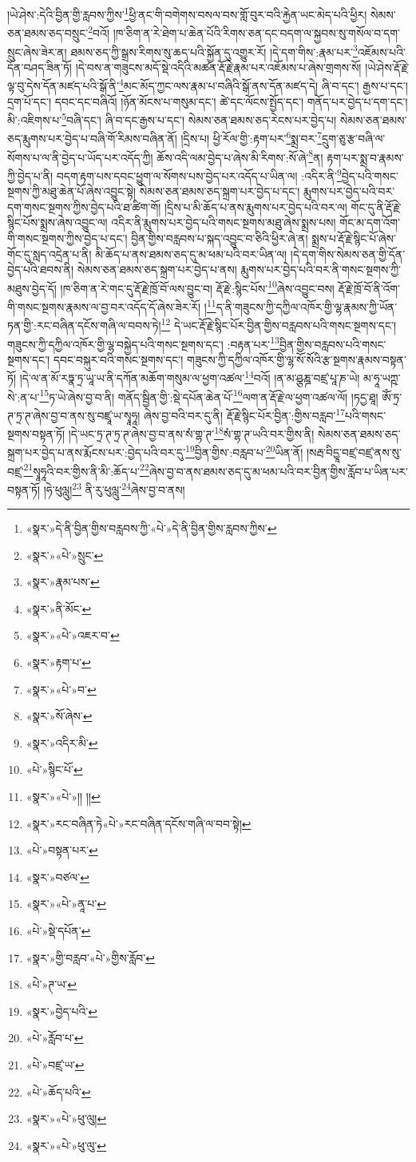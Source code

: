 །ཡེ་ཤེས་:དེའི་བྱིན་གྱི་རླབས་ཀྱིས་\footnote{«སྣར་»དེ་ནི་བྱིན་གྱིས་བརླབས་ཀྱི་«པེ་»དེ་ནི་བྱིན་གྱིས་རླབས་ཀྱིས་}ཕྱི་ནང་གི་བགེགས་བསལ་བས་གློ་བུར་བའི་རྐྱེན་ཡང་མེད་པའི་ཕྱིར། སེམས་ཅན་ཐམས་ཅད་བསྲུང་\footnote{«སྣར་»«པེ་»སྲུང་}བའོ། །ཁ་ཅིག་ན་རེ་ཐེག་པ་ཆེན་པོའི་རིགས་ཅན་དང་བདག་ལ་སྐྱབས་སུ་གསོལ་བ་དག་སྲུང་ཞེས་ཟེར་ན། ཐམས་ཅད་ཀྱི་སྒྲས་རིགས་སུ་ཆད་པའི་སྐྱོན་དུ་འགྱུར་རོ། །དེ་དག་གིས་:རྣམ་པར་\footnote{«སྣར་»རྣམ་པས་}འཇོམས་པའི་དོན་བཤད་ཟིན་ཏོ། །དེ་བས་ན་གཟུངས་མདོ་སྡེ་འདིའི་མཚན་རྡོ་རྗེ་རྣམ་པར་འཇོམས་པ་ཞེས་གྲགས་སོ། །ཡེ་ཤེས་རྡོ་རྗེ་ལྟ་བུ་དེས་དོན་མཛད་པའི་སྒོ་ནི་\footnote{«སྣར་»ནི་མོང་}མང་མོད་ཀྱང་ལས་རྣམ་པ་བཞིའི་སྒོ་ནས་དོན་མཛད་དེ། ཞི་བ་དང་། རྒྱས་པ་དང་། དྲག་པོ་དང་། དབང་དང་བཞིའོ། །ཉོན་མོངས་པ་གསུམ་དང་། ཚེ་དང་ལོངས་སྤྱོད་དང་། གནོད་པར་བྱེད་པ་དག་དང་། མི་:འཇིགས་པ་\footnote{«སྣར་»«པེ་»འཇར་བ་}བཞི་དང་། ཞི་བ་དང་རྒྱས་པ་དང་། སེམས་ཅན་ཐམས་ཅད་རེངས་པར་བྱེད་པ། སེམས་ཅན་ཐམས་ཅད་རྨུགས་པར་བྱེད་པ་བཞི་གོ་རིམས་བཞིན་ནོ། །དྲིས་པ། ཕྱི་རོལ་གྱི་:རྟག་པར་\footnote{«སྣར་»རྟག་པ་}སྨྲ་བར་\footnote{«སྣར་»«པེ་»བ་}དྲུག་ཅུ་རྩ་བཞི་ལ་སོགས་པ་ལ་ནི་བྱེད་པ་ཡོད་པར་འདོད་ཀྱི། ཆོས་འདི་ལམ་བྱེད་པ་ཞེས་མི་རིགས་:སོ་ཞེ་\footnote{«སྣར་»སོ་ཞེས་}ན། རྟག་པར་སྨྲ་བ་རྣམས་ཀྱི་བྱེད་པ་ནི། བདག་རྟག་པས་དབང་ཕྱུག་ལ་སོགས་པས་བྱེད་པར་འདོད་པ་ཡིན་ལ། :འདིར་ནི་\footnote{«སྣར་»འདིར་མི་}བྱེད་པའི་གསང་སྔགས་ཀྱི་མཐུ་ཆེན་པོ་ཞེས་འབྱུང་སྟེ། སེམས་ཅན་ཐམས་ཅད་སྐྲག་པར་བྱེད་པ་དང་། རྨུགས་པར་བྱེད་པའི་བར་དག་གསང་སྔགས་ཀྱིས་བྱེད་པའི་ཐ་ཚིག་གོ། །དྲིས་པ་མི་ཆོད་པ་ནས་རྨུགས་པར་བྱེད་པའི་བར་ལ། གོང་དུ་ནི་རྡོ་རྗེ་སྙིང་པོས་སྨྲས་ཞེས་འབྱུང་ལ། འདིར་ནི་རྨུགས་པར་བྱེད་པའི་གསང་སྔགས་མཐུ་ཞེས་སྨྲས་པས། གོང་མ་དག་འོག་གི་གསང་སྔགས་ཀྱིས་བྱེད་པ་དང་། བྱིན་གྱིས་བརླབས་པ་སྐད་འབྱུང་བ་ཅིའི་ཕྱིར་ཞེ་ན། སྨྲས་པ་རྡོ་རྗེ་སྙིང་པོ་ཞེས་གོང་དུ་སླད་འདྲེན་པ་ནི། མི་ཆོད་པ་ནས་ཐམས་ཅད་དུ་མ་ཕམ་པའི་བར་ཡིན་ལ། །དེ་དག་གིས་སེམས་ཅན་གྱི་དོན་བྱེད་པའི་ཐབས་ནི། སེམས་ཅན་ཐམས་ཅད་སྐྲག་པར་བྱེད་པ་ནས། རྨུགས་པར་བྱེད་པའི་བར་ནི་གསང་སྔགས་ཀྱི་མཐུས་བྱེད་དོ། །ཁ་ཅིག་ན་རེ་གང་དུ་རྡོ་རྗེ་ཁྲོ་བོ་ལས་བྱུང་བ། རྡོ་རྗེ་:སྙིང་པོས་\footnote{«པེ་»སྙིང་པོ་}ཞེས་འབྱུང་བས། རྡོ་རྗེ་ཁྲོ་བོ་ནི་འོག་གི་གསང་སྔགས་རྣམས་ལ་བྱ་བར་འདོད་དོ་ཞེས་ཟེར་རོ། །\footnote{«སྣར་»«པེ་»།། །།}ད་ནི་གཟུངས་ཀྱི་དཀྱིལ་འཁོར་གྱི་ལྷ་རྣམས་ཀྱི་ཡོན་ཏན་གྱི་:རང་བཞིན་དངོས་གཞི་ལ་བབས་ཏེ།\footnote{«སྣར་»རང་བཞིན་ཏེ«པེ་»རང་བཞིན་དངོས་གཞི་ལ་བབ་སྟེ།} དེ་ཡང་རྡོ་རྗེ་སྙིང་པོར་བྱིན་གྱིས་བརླབས་པའི་གསང་སྔགས་དང་། གཟུངས་ཀྱི་དཀྱིལ་འཁོར་གྱི་ལྷ་བསྐྱེད་པའི་གསང་སྔགས་དང་། :བརྟན་པར་\footnote{«པེ་»བསྟན་པར་}བྱིན་གྱིས་བརླབས་པའི་གསང་སྔགས་དང་། དབང་བསྐུར་བའི་གསང་སྔགས་དང་། གཟུངས་ཀྱི་དཀྱིལ་འཁོར་གྱི་ལྷ་སོ་སོའི་རྩ་སྔགས་རྣམས་བསྟན་ཏོ། །དེ་ལ་ན་མོ་རཏྣ་ཏྲ་ཡཱ་ཡ་ནི་དཀོན་མཆོག་གསུམ་ལ་ཕྱག་འཚལ་\footnote{«སྣར་»བཙལ་}བའོ། །ན་མ་ཤྩཎྜ་བཛྲ་པཱ་ཎ་ཡེ། མ་ཧཱ་ཡཀྵ་སེ་:ན་པ་\footnote{«སྣར་»«པེ་»ནཱ་པ་}ཏ་ཡེ་ཞེས་བྱ་བ་ནི། གནོད་སྦྱིན་གྱི་:སྡེ་དཔོན་ཆེན་པོ་\footnote{«པེ་»སྡེ་དཔོན་}ལག་ན་རྡོ་རྗེ་ལ་ཕྱག་འཚལ་ལོ། །ཏདྱ་ཐཱ། ཨོཾ་ཏྲ་ཊ་ཏྲ་ཊ་ཞེས་བྱ་བ་ནས་སུ་བཛྲཱ་ཡ་སྭཱཧཱ། ཞེས་བྱ་བའི་བར་དུ་ནི། རྡོ་རྗེ་སྙིང་པོར་བྱིན་:གྱིས་བརླབ་\footnote{«སྣར་»གྱི་བརླབ་«པེ་»གྱིས་རློབ་}པའི་གསང་སྔགས་བསྟན་ཏོ། །དེ་ཡང་ཏྲ་ཊ་ཏྲ་ཊ་ཞེས་བྱ་བ་ནས་སཾ་གྷ་ཊ་\footnote{«པེ་»ཊ་ཡ་}སཾ་གྷ་ཊ་ཡའི་བར་གྱིས་ནི། སེམས་ཅན་ཐམས་ཅད་སྐྲག་པར་བྱེད་པ་ནས་རྨོངས་པར་:བྱེད་པའི་བར་དུ་\footnote{«སྣར་»བྱེད་པའི་}བྱིན་གྱིས་:བརླབ་པ་\footnote{«པེ་»རློབ་པ་}ཡིན་ནོ། །སརྦ་བིདྱཱ་བཛྲ་བཛྲ་ནས་སུ་བཛྲ་\footnote{«པེ་»བཛྲ་ཡ་}སྭཱཧཱའི་བར་གྱིས་ནི་མི་:ཆོད་པ་\footnote{«པེ་»ཆོད་པའི་}ཞེས་བྱ་བ་ནས་ཐམས་ཅད་དུ་མ་ཕམ་པའི་བར་བྱིན་གྱིས་རློབ་པ་ཡིན་པར་བསྟན་ཏོ། །ཧེ་ཕུལླུ།\footnote{«སྣར་»«པེ་»ཕུ་ལུ།} ནི་རུ་ཕུལླུ་\footnote{«སྣར་»«པེ་»ཕུ་ལུ་}ཞེས་བྱ་བ་ནས། 
